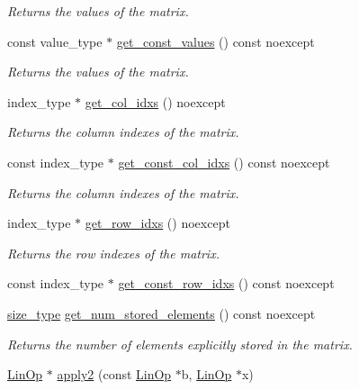 \begin{DoxyCompactItemize}
\begin{DoxyCompactList}\small\item\em Returns the values of the matrix. \end{DoxyCompactList}\item 
const value\+\_\+type $\ast$ \hyperlink{classgko_1_1matrix_1_1Coo_af0f6fe19d81bc4207aad66376f9c87c5}{get\+\_\+const\+\_\+values} () const noexcept
\begin{DoxyCompactList}\small\item\em Returns the values of the matrix. \end{DoxyCompactList}\item 
index\+\_\+type $\ast$ \hyperlink{classgko_1_1matrix_1_1Coo_a1b619cf23c7c87cb4109432c8e8db66d}{get\+\_\+col\+\_\+idxs} () noexcept
\begin{DoxyCompactList}\small\item\em Returns the column indexes of the matrix. \end{DoxyCompactList}\item 
const index\+\_\+type $\ast$ \hyperlink{classgko_1_1matrix_1_1Coo_ae4afdbf2dc5a5a42a197f3a479febc75}{get\+\_\+const\+\_\+col\+\_\+idxs} () const noexcept
\begin{DoxyCompactList}\small\item\em Returns the column indexes of the matrix. \end{DoxyCompactList}\item 
index\+\_\+type $\ast$ \hyperlink{classgko_1_1matrix_1_1Coo_a57aa0f7b701020c4322a3aed63d8a25d}{get\+\_\+row\+\_\+idxs} () noexcept
\begin{DoxyCompactList}\small\item\em Returns the row indexes of the matrix. \end{DoxyCompactList}\item 
const index\+\_\+type $\ast$ \hyperlink{classgko_1_1matrix_1_1Coo_a0fe0f33bf492bf2f9134927c7ee90e81}{get\+\_\+const\+\_\+row\+\_\+idxs} () const noexcept
\item 
\hyperlink{namespacegko_a6e5c95df0ae4e47aab2f604a22d98ee7}{size\+\_\+type} \hyperlink{classgko_1_1matrix_1_1Coo_aece531e069f8490fd8d2b3ab58f72d09}{get\+\_\+num\+\_\+stored\+\_\+elements} () const noexcept
\begin{DoxyCompactList}\small\item\em Returns the number of elements explicitly stored in the matrix. \end{DoxyCompactList}\item 
\hyperlink{classgko_1_1LinOp}{Lin\+Op} $\ast$ \hyperlink{classgko_1_1matrix_1_1Coo_ad2e97eee0ad21f8896f4a82cc5ac8a50}{apply2} (const \hyperlink{classgko_1_1LinOp}{Lin\+Op} $\ast$b, \hyperlink{classgko_1_1LinOp}{Lin\+Op} $\ast$x)

\end{DoxyCompactItemize}
